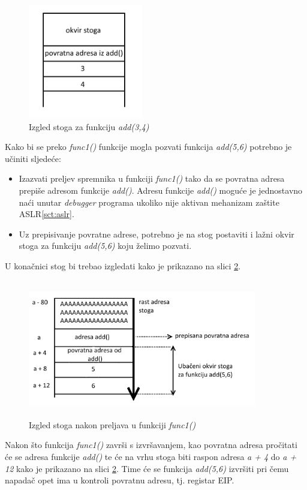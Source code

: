 \documentclass[times, utf8, diplomski, numeric]{fer}
\begin{document}
\begin{figure}[!htb]
\centering
\setlength\fboxsep{0pt}
\setlength\fboxrule{0.5pt}
\includegraphics[width=5cm, height=5cm]{slike/rop_add34}
\caption{Izgled stoga za funkciju \emph{add(3,4)}}
\label{fig:rop_add34} 
\end{figure}
Kako bi se preko \emph{func1()} funkcije mogla pozvati funkcija \emph{add(5,6)} potrebno je učiniti sljedeće:
\begin{itemize}
\item Izazvati preljev spremnika u funkciji \emph{func1()} tako da se povratna adresa prepiše adresom funkcije \emph{add()}. Adresu funkcije \emph{add()} moguće je jednostavno naći unutar \emph{debugger} programa ukoliko nije aktivan mehanizam zaštite ASLR\ref{sct:aslr}.
\item Uz prepisivanje povratne adrese, potrebno je na stog postaviti i lažni okvir stoga za funkciju \emph{add(5,6)} koju želimo pozvati.
\end{itemize}
U konačnici stog bi trebao izgledati kako je prikazano na slici \ref{fig:rop_add56}.

\begin{figure}[!htb]
\centering
\setlength\fboxsep{0pt}
\setlength\fboxrule{0.5pt}
\includegraphics[width=10cm, height=6cm]{slike/rop_add56}
\caption{Izgled stoga nakon preljava u funkciji \emph{func1()}}
\label{fig:rop_add56} 
\end{figure}
Nakon što funkcija \emph{func1()} završi s izvršavanjem, kao povratna adresa pročitati će se adresa funkcije \emph{add()} te će na vrhu stoga biti raspon adresa \emph{a + 4} do \emph{a + 12} kako je prikazano na slici \ref{fig:rop_add56}. Time će se funkcija \emph{add(5,6)} izvršiti pri čemu napadač opet ima u kontroli povratnu adresu, tj. registar EIP.
\end{document}
